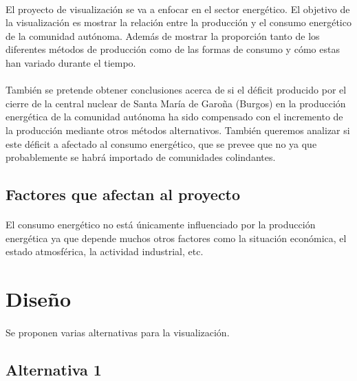 \documentclass{article}
\begin{document}
			\paragraph{}
			El proyecto de visualización se va a enfocar en el sector energético. El objetivo de la visualización es mostrar la relación entre la producción y el consumo energético de la comunidad autónoma. Además de mostrar la proporción tanto de los diferentes métodos de producción como de las formas de consumo y cómo estas han variado durante el tiempo.

			\paragraph{}
			También se pretende obtener conclusiones acerca de si el déficit producido por el cierre de la central nuclear de Santa María de Garoña (Burgos) en la producción energética de la comunidad autónoma ha sido compensado con el incremento de la producción mediante otros métodos alternativos. También queremos analizar si este déficit a afectado al consumo energético, que se prevee que no ya que probablemente se habrá importado de comunidades colindantes.

		\subsection{Factores que afectan al proyecto}

			\paragraph{}
			El  consumo energético no está únicamente influenciado por la producción energética ya que depende muchos otros factores como la situación económica, el estado atmosférica, la actividad industrial, etc.


	\section{Diseño}

		\paragraph{}
		Se proponen varias alternativas para la visualización.


		\subsection{Alternativa 1}
\end{document}
